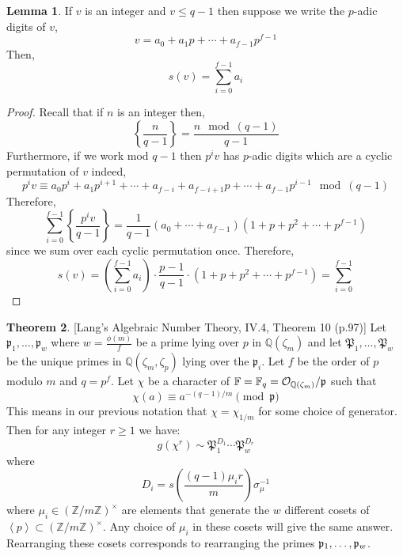 \documentclass[12pt]{article}
\newcommand{\Z}{\mathbb{Z}}
\newcommand{\Q}{\mathbb{Q}}
\newcommand{\FF}{\mathbb{F}}
\theoremstyle{remark}
\theoremstyle{definition}
\newtheorem{theorem}{Theorem}[subsection]
\newtheorem{lemma}[theorem]{Lemma}
\begin{document}
\begin{lemma}
If $v$ is an integer and $v \le q-1$ then suppose we write the $p$-adic digits of $v$,
\[ v = a_0 + a_1 p + \cdots + a_{f-1} p^{f-1} \]
Then,
\[ s(v) = \sum_{i = 0}^{f-1} a_i \]
\end{lemma}

\begin{proof}
Recall that if $n$ is an integer then,
\[ \left\{ \frac{n}{q-1} \right\} = \frac{n \mod (q-1)}{q-1} \]
Furthermore, if we work mod $q-1$ then $p^i v$ has $p$-adic digits which are a cyclic permutation of $v$ indeed,
\[ p^i v \equiv a_0 p^i + a_1 p^{i+1} + \cdots + a_{f-i} + a_{f-i+1} p + \cdots + a_{f-1} p^{i-1} \mod (q-1) \]
Therefore,
\[ \sum_{i = 0}^{f-1} \left\{ \frac{p^i v}{q - 1} \right\} = \frac{1}{q-1} \left( a_0 + \cdots + a_{f-1} \right) \left( 1 + p + p^2 + \cdots + p^{f-1} \right) \]
since we sum over each cyclic permutation once. Therefore,
\[ s(v) = \left( \sum_{i = 0}^{f-1} a_i \right) \cdot \frac{p-1}{q-1} \cdot (1 + p + p^2 + \cdots + p^{f-1} ) = \sum_{i = 0}^{f-1} \]
\end{proof}


\begin{theorem} \label{thm:gauss_fact_lang}[Lang's Algebraic Number Theory, IV.4, Theorem 10 (p.97)]
Let $\mathfrak{p}_1, \dots, \mathfrak{p}_w$ where $w = \frac{\phi(m)}{f}$ be a prime lying over $p$ in $\Q(\zeta_{m})$ and let $\mathfrak{P}_1, \dots, \mathfrak{P}_w$ be the unique primes in $\mathbb{Q}(\zeta_{m}, \zeta_p)$ lying over the $\mathfrak{p}_i$. Let $f$ be the order of $p$ modulo $m$ and $q = p^f$. Let $\chi$ be a character of $\FF = \FF_q = \iO_{\Q(\zeta_m)} / \p$ such that
\[\chi(a) \equiv a^{-(q-1)/m} \pmod{\mathfrak{p}}\]
This means in our previous notation that $\chi = \chi_{1/m}$ for some choice of generator.
Then for any integer $r \ge 1$ we have:
\[ g\left(\chi^r\right) \sim \mathfrak{P}_1^{D_1} \cdots \mathfrak{P}_w^{D_r} \]
where 
\[ D_i = s\left(\frac{(q-1)\mu_i r}{m}\right)\sigma_{\mu}^{-1}\]
where $\mu_i \in (\Z / m \Z)^\times$ are elements that generate the $w$ different cosets of $\left< p \right> \subset (\Z / m \Z)^\times$. Any choice of $\mu_i$ in these cosets will give the same answer. Rearranging these cosets corresponds to rearranging the primes $\mathfrak{p}_1, \dots, \mathfrak{p}_w$. 
\end{theorem}

\newcommand{\fp}{\mathfrak{p}}
\newcommand{\fP}{\mathfrak{P}}
\end{document}
